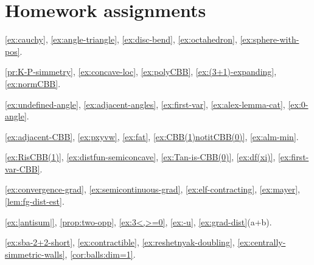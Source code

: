 \chapter*{Homework assignments}

\ref{ex:cauchy},
\ref{ex:angle-triangle},
\ref{ex:disc-bend},
\ref{ex:octahedron},
\ref{ex:sphere-with-pos}.

\ref{pr:K-P-simmetry},
\ref{ex:concave-loc},
\ref{ex:polyCBB},
\ref{ex:(3+1)-expanding},
\ref{ex:normCBB}.

\ref{ex:undefined-angle},
\ref{ex:adjacent-angles},
\ref{ex:first-var},
\ref{ex:alex-lemma-cat},
\ref{ex:0-angle}.

\ref{ex:adjacent-CBB},
\ref{ex:pxyvw},
\ref{ex:fat},
\ref{ex:CBB(1)notitCBB(0)},
\ref{ex:alm-min}.

\ref{ex:RisCBB(1)},
\ref{ex:distfun-semiconcave},
\ref{ex:Tan-is-CBB(0)},
\ref{ex:df(xi)},
\ref{ex:first-var-CBB}.

\ref{ex:convergence-grad},
\ref{ex:semicontinuous-grad},
\ref{ex:elf-contracting},
\ref{ex:mayer},
\ref{lem:fg-dist-est}.

\ref{ex:|antisum|},
\ref{prop:two-opp},
\ref{ex:3<,>=0},
\ref{ex:-u},
\ref{ex:grad-dist}(a+b).

\ref{ex:sba-2+2-short},
\ref{ex:contractible},
\ref{ex:reshetnyak-doubling},
\ref{ex:centrally-simmetric-walls},
\ref{cor:balls:dim=1}.

